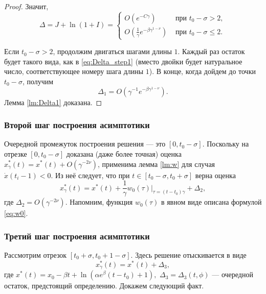 \begin{proof}
Значит,
\begin{equation}
	\label{eq:Delta_step1}
\Delta = J + \ln(1 + I) = 
\begin{cases}
	O(e^{-C \gamma}) & \text{ при } t_0 - \sigma > 2,\\
	O(\frac{1}{\gamma} e^{-\beta \gamma^{1 - \nu}}) & \text{ при } t_0 - \sigma \leq 2.
\end{cases}
\end{equation}

Если $t_0 - \sigma > 2$, продолжим двигаться шагами длины $1$. Каждый раз остаток будет такого вида, как в \eqref{eq:Delta_step1} (вместо двойки будет натуральное число, соответствующее номеру шага длины $1$). В конце, когда дойдем до точки $t_0 - \sigma$, получим
%
\[
\Delta_1=O(\gamma^{-1} e^{-\beta\gamma^{1 - \nu}}).
\]
%
Лемма \ref{lm:Delta1} доказана.

\end{proof}

\subsubsection{Второй шаг построения асимптотики}
Очередной промежуток построения решения --- это $[0, t_0 - \sigma]$. Поскольку на отрезке $[0, t_0 - \sigma]$ доказана (даже более точная) оценка $x^*_\gamma(t) = x^*(t) + O(\gamma^{-2\nu})$, применима лемма \ref{lm:w} для случая $\dot{x}(t_i - 1) < 0$. Из неё следует, что при $t \in [t_0 - \sigma, t_0 + \sigma]$ верна оценка
\begin{equation}
	\label{eq:sol_2}
	x_{\gamma}^*(t) = x^*(t) + \frac{1}{\gamma} w_0(\tau)\bigg\vert_{\tau=(t - t_0)\gamma} + \Delta_2,
\end{equation}
где $\Delta_2 = O(\gamma^{-2\nu})$. Напомним, функция $w_0(\tau)$ в явном виде описана формулой \ref{eq:w0}.

\subsubsection{Третий шаг построения асимптотики}
Рассмотрим отрезок $[t_0 + \sigma, t_0 + 1 - \sigma]$. Здесь решение отыскивается в виде
\begin{equation}
	\label{eq:sol_3}
	x_\gamma^*(t) = x^*(t) + \Delta_3,
\end{equation}
где $x^*(t) = x_0 - \beta t +\ln(\alpha e^{\beta}(t - t_0)+1),$ $\Delta_3 = \Delta_3(t, \phi)$ --- очередной остаток, предстоящий определению. Докажем следующий факт.

